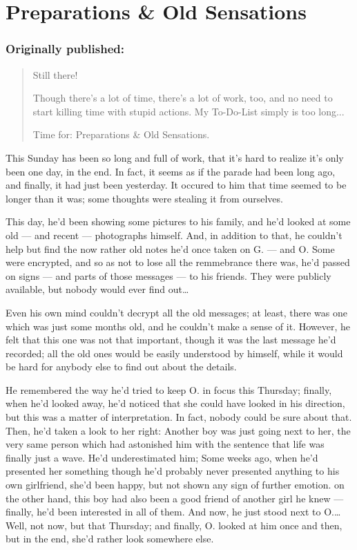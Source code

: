 \chapter{Preparations \& Old Sensations}
\label{cha:preparations-and-old-sensations}
\subsection*{Originally published: }
\begin{quote}
Still there!

Though there's a lot of time, there's a lot of work, too, and no need to start killing time with stupid actions. My To-Do-List simply is too long...

Time for: Preparations \& Old Sensations.
\end{quote}

This Sunday has been so long and full of work, that it's hard to realize it's only been one day, in the end. In fact, it seems as if the parade had been long ago, and finally, it had just been yesterday. It occured to him that time seemed to be longer than it was; some thoughts were stealing it from ourselves.

This day, he'd been showing some pictures to his family, and he'd looked at some old --- and recent --- photographs himself. And, in addition to that, he couldn't help but find the now rather old notes he'd once taken on G. --- and O. Some were encrypted, and so as not to lose all the remmebrance there was, he'd passed on signs --- and parts of those messages --- to his friends. They were publicly available, but nobody would ever find out\ldots

Even his own mind couldn't decrypt all the old messages; at least, there was one which was just some months old, and he couldn't make a sense of it. However, he felt that this one was not that important, though it was the last message he'd recorded; all the old ones would be easily understood by himself, while it would be hard for anybody else to find out about the details.

He remembered the way he'd tried to keep O. in focus this Thursday; finally, when he'd looked away, he'd noticed that she could have looked in his direction, but this was a matter of interpretation. In fact, nobody could be sure about that. Then, he'd taken a look to her right: Another boy was just going next to her, the very same person which had astonished him with the sentence that life was finally just a wave. He'd underestimated him; Some weeks ago, when he'd presented her something though he'd probably never presented anything to his own girlfriend, she'd been happy, but not shown any sign of further emotion. on the other hand, this boy had also been a good friend of another girl he knew --- finally, he'd been interested in all of them. And now, he just stood next to O.\ldots
Well, not now, but that Thursday; and finally, O. looked at him once and then, but in the end, she'd rather look somewhere else.

